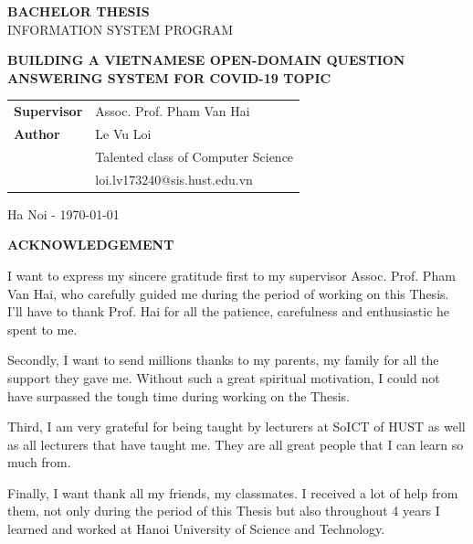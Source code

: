 \documentclass[3p, sort&compress, 12pt]{elsarticle}
\begin{document}
\begin{center}
	{\fontsize{36}{\baselineskip}\selectfont\sf\bfseries BACHELOR THESIS}\\[20pt]
	{\fontsize{24}{\baselineskip}\selectfont\sf INFORMATION SYSTEM PROGRAM}	\\[30pt]
	\begin{spacing}{1.75}
		{\fontsize{22}{\baselineskip}\selectfont\sf\bfseries BUILDING A VIETNAMESE OPEN-DOMAIN QUESTION ANSWERING SYSTEM FOR COVID-19 TOPIC}
	\end{spacing}
	\vspace*{2.0cm}
	
	\begin{table}[!htbp]
	{\fontsize{15}{\baselineskip}\selectfont
	\begin{tabular}{T{.3\linewidth}p{.5\linewidth}}
		{\sf\bfseries Supervisor} & {\sf Assoc. Prof. Pham Van Hai} \\[10pt] 
		{\sf\bfseries Author} & {\sf Le Vu Loi} \\[4pt]
		& {\sf Talented class of Computer Science} \\[4pt]
		& {\sf loi.lv173240@sis.hust.edu.vn}
	\end{tabular}}
	\end{table}
	\vspace*{2cm}
	\begin{center}
		{\Large\sf Ha Noi - \today}
	\end{center}
\end{center}
\newpage
\tableofcontents
\listoffigures
\listoftables
\newpage
\begin{center}
	\fontsize{20}{\baselineskip}\selectfont\sf\bfseries ACKNOWLEDGEMENT
\end{center}
I want to express my sincere gratitude first to my supervisor Assoc. Prof. Pham Van Hai, who carefully guided me during the period of working on this Thesis. I'll have to thank Prof. Hai for all the patience, carefulness and enthusiastic he spent to me.
\par Secondly, I want to send millions thanks to my parents, my family for all the support they gave me. Without such a great spiritual motivation, I could not have surpassed the tough time during working on the Thesis.
\par Third, I am very grateful for being taught by lecturers at SoICT of HUST as well as all lecturers that have taught me. They are all great people that I can learn so much from.
\par Finally, I want thank all my friends, my classmates. I received a lot of help from them, not only during the period of this Thesis but also throughout 4 years I learned and worked at Hanoi University of Science and Technology.
\end{document}
